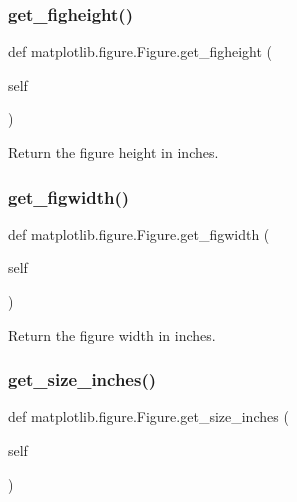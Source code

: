 \subsubsection{\texorpdfstring{get\+\_\+figheight()}{get\_figheight()}}
{\footnotesize\ttfamily def matplotlib.\+figure.\+Figure.\+get\+\_\+figheight (\begin{DoxyParamCaption}\item[{}]{self }\end{DoxyParamCaption})}

\begin{DoxyVerb}Return the figure height in inches.\end{DoxyVerb}
 \mbox{\label{classmatplotlib_1_1figure_1_1Figure_a0a927243f15925482c1989829f9cfa5f}} 
\subsubsection{\texorpdfstring{get\+\_\+figwidth()}{get\_figwidth()}}
{\footnotesize\ttfamily def matplotlib.\+figure.\+Figure.\+get\+\_\+figwidth (\begin{DoxyParamCaption}\item[{}]{self }\end{DoxyParamCaption})}

\begin{DoxyVerb}Return the figure width in inches.\end{DoxyVerb}
 \mbox{\label{classmatplotlib_1_1figure_1_1Figure_a01114d214b48279bb5b81d89f0874d18}} 
\subsubsection{\texorpdfstring{get\+\_\+size\+\_\+inches()}{get\_size\_inches()}}
{\footnotesize\ttfamily def matplotlib.\+figure.\+Figure.\+get\+\_\+size\+\_\+inches (\begin{DoxyParamCaption}\item[{}]{self }\end{DoxyParamCaption})}

